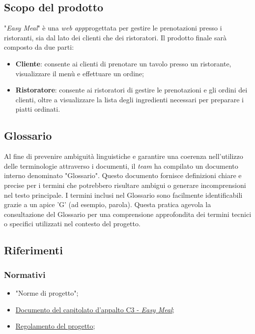 \subsection{Scopo del prodotto}

"\textit{Easy Meal}" è una \textit{web app}\g progettata per gestire le
prenotazioni presso i ristoranti, sia dal lato dei clienti che dei ristoratori.
Il prodotto finale sarà composto da due parti:

\begin{itemize}
	\item \textbf{Cliente\g}: consente ai clienti di prenotare un tavolo presso un
	      ristorante, visualizzare il menù e effettuare un ordine\g;

	\item \textbf{Ristoratore}: consente ai ristoratori di gestire le
	      prenotazioni e gli ordini dei clienti, oltre a visualizzare la lista
	      degli ingredienti necessari per preparare i piatti ordinati.
\end{itemize}

\subsection{Glossario}

Al fine di prevenire ambiguità linguistiche e garantire una coerenza nell'utilizzo
delle terminologie attraverso i documenti, il \textit{team} ha compilato un documento
interno denominato "Glossario".
Questo documento fornisce definizioni chiare e precise per i termini che potrebbero
risultare ambigui o generare incomprensioni nel testo principale.
I termini inclusi nel Glossario sono facilmente identificabili grazie a un apice 'G'
(ad esempio, parola\g).
Questa pratica agevola la consultazione del Glossario per una comprensione approfondita
dei termini tecnici o specifici utilizzati nel contesto del progetto.

\subsection{Riferimenti}

\subsubsection{Normativi}
\begin{itemize}
	\item "Norme di progetto";
	\item 	\href{https://www.math.unipd.it/~tullio/IS-1/2023/Progetto/C3.pdf}
	      {Documento del capitolato d'appalto C3 - \textit{Easy Meal}};
	\item \href{https://www.math.unipd.it/~tullio/IS-1/2023/Dispense/PD2.pdf}
	      {Regolamento del progetto};
\end{itemize}

